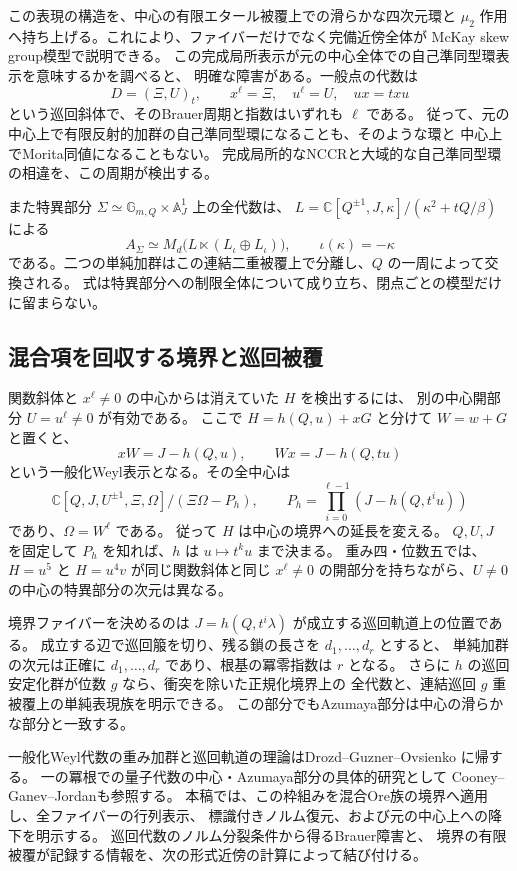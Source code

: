 この表現の構造を、中心の有限エタール被覆上での滑らかな四次元環と
$\mu_2$ 作用へ持ち上げる。これにより、ファイバーだけでなく完備近傍全体が
McKay skew group模型で説明できる。
この完成局所表示が元の中心全体での自己準同型環表示を意味するかを調べると、
明確な障害がある。一般点の代数は
\[
 D=(\Xi,U)_t,\qquad
 x^\ell=\Xi,\quad u^\ell=U,\quad ux=txu
\]
という巡回斜体で、そのBrauer周期と指数はいずれも $\ell$ である。
従って、元の中心上で有限反射的加群の自己準同型環になることも、そのような環と
中心上でMorita同値になることもない。
完成局所的なNCCRと大域的な自己準同型環の相違を、この周期が検出する。

また特異部分 $\Sigma\simeq\mathbb G_{m,Q}\times\mathbb A^1_J$ 上の全代数は、
$L=\mathbb C[Q^{\pm1},J,\kappa]/(\kappa^2+tQ/\beta)$ による
\[
 A_\Sigma\simeq M_d\bigl(L\ltimes(L_\iota\oplus L_\iota)\bigr),
 \qquad\iota(\kappa)=-\kappa
\]
である。二つの単純加群はこの連結二重被覆上で分離し、$Q$ の一周によって交換される。
式は特異部分への制限全体について成り立ち、閉点ごとの模型だけに留まらない。

\subsection{混合項を回収する境界と巡回被覆}

関数斜体と $x^\ell\ne0$ の中心からは消えていた $H$ を検出するには、
別の中心開部分 $U=u^\ell\ne0$ が有効である。
ここで $H=h(Q,u)+xG$ と分けて $W=w+G$ と置くと、
\[
 xW=J-h(Q,u),\qquad Wx=J-h(Q,tu)
\]
という一般化Weyl表示となる。その全中心は
\[
 \mathbb C[Q,J,U^{\pm1},\Xi,\Omega]/(\Xi\Omega-P_h),
 \qquad P_h=\prod_{i=0}^{\ell-1}(J-h(Q,t^iu))
\]
であり、$\Omega=W^\ell$ である。
従って $H$ は中心の境界への延長を変える。
$Q,U,J$ を固定して $P_h$ を知れば、$h$ は $u\mapsto t^ku$ まで決まる。
重み四・位数五では、$H=u^5$ と $H=u^4v$ が同じ関数斜体と同じ
$x^\ell\ne0$ の開部分を持ちながら、$U\ne0$ の中心の特異部分の次元は異なる。

境界ファイバーを決めるのは $J=h(Q,t^i\lambda)$ が成立する巡回軌道上の位置である。
成立する辺で巡回箙を切り、残る鎖の長さを $d_1,\ldots,d_r$ とすると、
単純加群の次元は正確に $d_1,\ldots,d_r$ であり、根基の冪零指数は $r$ となる。
さらに $h$ の巡回安定化群が位数 $g$ なら、衝突を除いた正規化境界上の
全代数と、連結巡回 $g$ 重被覆上の単純表現族を明示できる。
この部分でもAzumaya部分は中心の滑らかな部分と一致する。

一般化Weyl代数の重み加群と巡回軌道の理論はDrozd--Guzner--Ovsienko
\cite{DGOBoundary39}に帰する。
一の冪根での量子代数の中心・Azumaya部分の具体的研究として
Cooney--Ganev--Jordan\cite{CGJBoundary39}も参照する。
本稿では、この枠組みを混合Ore族の境界へ適用し、全ファイバーの行列表示、
標識付きノルム復元、および元の中心上への降下を明示する。
巡回代数のノルム分裂条件\cite{MinacSchultzSwallowDescent39}から得るBrauer障害と、
境界の有限被覆が記録する情報を、次の形式近傍の計算によって結び付ける。

